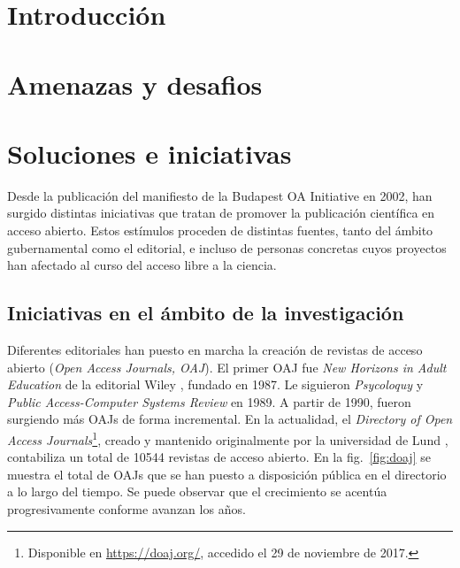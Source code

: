 \section{Introducción}
\section{Amenazas y desafios}
\section{Soluciones e iniciativas}

Desde la publicación del manifiesto de la Budapest OA Initiative \cite{boai} en 2002, han surgido distintas iniciativas que tratan de promover la publicación científica en acceso abierto. Estos estímulos proceden de distintas fuentes, tanto del ámbito gubernamental como el editorial, e incluso de personas concretas cuyos proyectos han afectado al curso del acceso libre a la ciencia.

\subsection{Iniciativas en el ámbito de la investigación}

Diferentes editoriales han puesto en marcha la creación de revistas de acceso abierto (\textit{Open Access Journals, OAJ}). El primer OAJ fue \textit{New Horizons in Adult Education} de la editorial Wiley \cite{earlyoaj}, fundado en 1987. Le siguieron \textit{Psycoloquy} y \textit{Public Access-Computer Systems Review} en 1989. A partir de 1990, fueron surgiendo más OAJs de forma incremental. En la actualidad, el \textit{Directory of Open Access Journals}\footnote{Disponible en \url{https://doaj.org/}, accedido el 29 de noviembre de 2017.}, creado y mantenido originalmente por la universidad de Lund \cite{nordic}, contabiliza un total de 10544 revistas de acceso abierto. En la fig.~\ref{fig:doaj} se muestra el total de OAJs que se han puesto a disposición pública en el directorio a lo largo del tiempo. Se puede observar que el crecimiento se acentúa progresivamente conforme avanzan los años.

